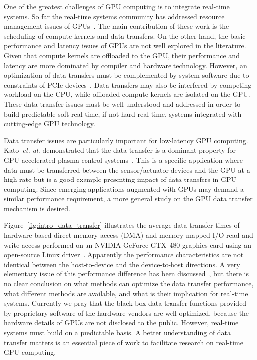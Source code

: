 One of the greatest challenges of GPU computing is to integrate
real-time systems.
So far the real-time systems community has addressed resource management
issues of GPUs~\cite{Basaran_ECRTS12, Elliott_RTS12, Elliott_ECRTS12,
Kato_ATC11, Kato_RTAS11, Kato_RTSS11}.
The main contribution of these work is the scheduling of compute
kernels and data transfers.
On the other hand, the basic performance and latency issues of GPUs are
not well explored in the literature.
Given that compute kernels are offloaded to the GPU, their performance
and latency are more dominated by compiler and hardware technology.
However, an optimization of data transfers must be complemented by system
software due to constraints of PCIe devices~\cite{Kato_ATC12}.
Data transfers may also be interfered by competing workload on the CPU,
while offloaded compute kernels are isolated on the GPU.
These data transfer issues must be well understood and addressed in
order to build predictable soft real-time, if not hard real-time,
systems integrated with cutting-edge GPU technology.

Data transfer issues are particularly important for low-latency GPU
computing.
Kato~\textit{et. al.} demonstrated that the data transfer is a dominant
property for GPU-accelerated plasma control systems~\cite{Kato_ICCPS13}.
This is a specific application where data must be transferred between the
sensor/actuator devices and the GPU at a high-rate but is a good example
presenting impact of data transfers in GPU computing.
Since emerging applications augmented with GPUs may demand a similar
performance requirement, a more general study on the GPU data transfer
mechanism is desired.

Figure~\ref{fig:intro_data_transfer} illustrates the average data
transfer times of hardware-based direct memory access (DMA) and
memory-mapped I/O read and write access performed on an NVIDIA GeForce
GTX~480 graphics card using an open-source Linux
driver~\cite{Kato_ATC12}.
Apparently the performance characteristics are not identical between the
host-to-device and the device-to-host directions.
A very elementary issue of this performance difference has been
discussed~\cite{Kato_ATC12}, but there is no clear conclusion on what
methods can optimize the data transfer performance, what different
methods are available, and what is their implication for real-time
systems.
Currently we pray that the black-box data transfer functions provided by
proprietary software of the hardware vendors are well optimized, because
the hardware details of GPUs are not disclosed to the public.
However, real-time systems must build on a predictable basis.
A better understanding of data transfer matters is an essential
piece of work to facilitate research on real-time GPU computing.

